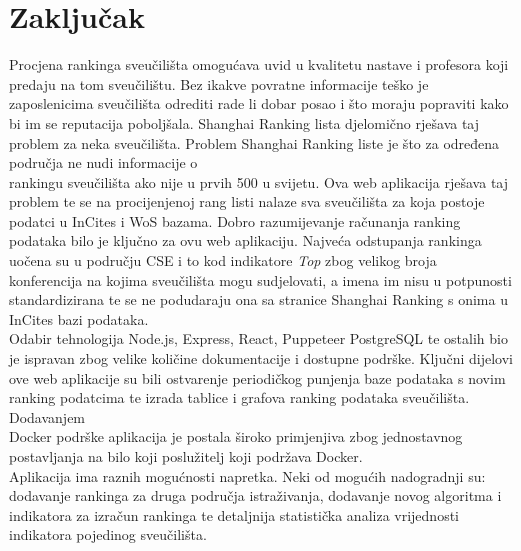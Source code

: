 \documentclass[times, utf8, zavrsni]{fer}
\begin{document}
\chapter{Zaključak}
Procjena rankinga sveučilišta omogućava uvid u kvalitetu nastave i profesora koji predaju na tom sveučilištu. Bez ikakve povratne informacije 
teško je zaposlenicima sveučilišta odrediti rade li dobar posao i što moraju popraviti kako bi im se reputacija poboljšala.
Shanghai Ranking lista djelomično rješava taj problem za neka sveučilišta. Problem Shanghai Ranking liste je što za određena područja ne nudi 
informacije o \\rankingu sveučilišta ako nije u prvih 500 u svijetu. Ova web aplikacija rješava taj problem te se na procijenjenoj rang listi nalaze sva sveučilišta 
za koja postoje podatci u InCites i WoS bazama. Dobro razumijevanje računanja ranking podataka bilo je ključno za ovu web aplikaciju. Najveća odstupanja rankinga 
uočena su u području CSE i to kod indikatore \emph{Top} zbog velikog broja konferencija na kojima sveučilišta mogu sudjelovati, a imena im nisu u potpunosti standardizirana te se ne podudaraju 
ona sa stranice Shanghai Ranking s onima u InCites bazi podataka. 
\\Odabir tehnologija Node.js, Express, React, Puppeteer PostgreSQL te ostalih bio je ispravan zbog velike količine dokumentacije i dostupne podrške. Ključni dijelovi 
ove web aplikacije su bili ostvarenje periodičkog punjenja baze podataka s novim ranking podatcima te izrada tablice i grafova ranking podataka sveučilišta. 
Dodavanjem \\Docker podrške aplikacija je postala široko primjenjiva zbog jednostavnog postavljanja na bilo koji poslužitelj koji podržava Docker.
\\Aplikacija ima raznih mogućnosti napretka. Neki od mogućih nadogradnji su: dodavanje rankinga za druga područja istraživanja, 
dodavanje novog algoritma i indikatora za izračun rankinga te detaljnija 
statistička analiza vrijednosti indikatora pojedinog sveučilišta.



\nocite{*}
\end{document}
